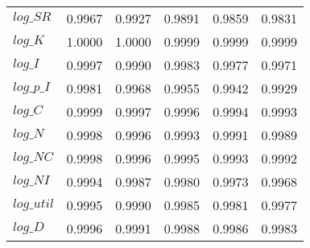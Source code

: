 \begin{center}
\begin{longtable}{lccccc}
$log\_SR    $	 & 	     0.9967	 & 	     0.9927	 & 	     0.9891	 & 	     0.9859	 & 	     0.9831 \\ 
$log\_K     $	 & 	     1.0000	 & 	     1.0000	 & 	     0.9999	 & 	     0.9999	 & 	     0.9999 \\ 
$log\_I     $	 & 	     0.9997	 & 	     0.9990	 & 	     0.9983	 & 	     0.9977	 & 	     0.9971 \\ 
$log\_p\_I  $	 & 	     0.9981	 & 	     0.9968	 & 	     0.9955	 & 	     0.9942	 & 	     0.9929 \\ 
$log\_C     $	 & 	     0.9999	 & 	     0.9997	 & 	     0.9996	 & 	     0.9994	 & 	     0.9993 \\ 
$log\_N     $	 & 	     0.9998	 & 	     0.9996	 & 	     0.9993	 & 	     0.9991	 & 	     0.9989 \\ 
$log\_NC    $	 & 	     0.9998	 & 	     0.9996	 & 	     0.9995	 & 	     0.9993	 & 	     0.9992 \\ 
$log\_NI    $	 & 	     0.9994	 & 	     0.9987	 & 	     0.9980	 & 	     0.9973	 & 	     0.9968 \\ 
$log\_util  $	 & 	     0.9995	 & 	     0.9990	 & 	     0.9985	 & 	     0.9981	 & 	     0.9977 \\ 
$log\_D     $	 & 	     0.9996	 & 	     0.9991	 & 	     0.9988	 & 	     0.9986	 & 	     0.9983 \\ 
\end{longtable}
 \end{center}
